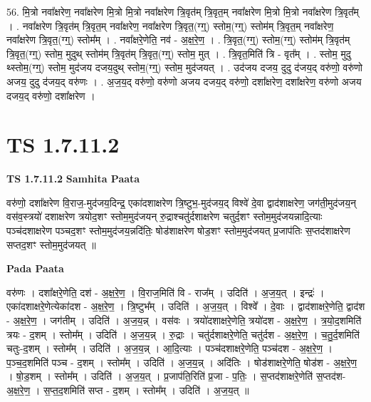 \documentclass[17pt]{extarticle}
\begin{document}
56. मि॒त्रो नवा᳚क्षरेण॒ नवा᳚क्षरेण मि॒त्रो मि॒त्रो नवा᳚क्षरेण त्रि॒वृत॑म् त्रि॒वृत॒म् नवा᳚क्षरेण मि॒त्रो मि॒त्रो नवा᳚क्षरेण त्रि॒वृत᳚म् । . नवा᳚क्षरेण त्रि॒वृत॑म् त्रि॒वृत॒म् नवा᳚क्षरेण॒ नवा᳚क्षरेण त्रि॒वृत॒(ग्ग्॒) स्तोम॒(ग्ग्॒) स्तोम॑म् त्रि॒वृत॒म् 
नवा᳚क्षरेण॒ नवा᳚क्षरेण त्रि॒वृत॒(ग्ग्॒) स्तोम᳚म् । . नवा᳚क्षरे॒णेति॒ नव॑ - अ॒क्ष॒रे॒ण॒ । . त्रि॒वृत॒(ग्ग्॒) स्तोम॒(ग्ग्॒) स्तोम॑म् त्रि॒वृत॑म् त्रि॒वृत॒(ग्ग्॒) स्तोम॒ मुदुथ् स्तोम॑म् त्रि॒वृत॑म् त्रि॒वृत॒(ग्ग्॒) स्तोम॒ मुत् । . त्रि॒वृत॒मिति॑ त्रि - वृत᳚म् । . स्तोम॒ मुदु थ्स्तोम॒(ग्ग्॒) स्तोम॒ मुद॑जय दजय॒दुथ् स्तोम॒(ग्ग्॒) स्तोम॒ मुद॑जयत् । . उद॑जय दजय॒ दुदु द॑जय॒द् वरु॑णो॒ वरु॑णो अजय॒ दुदु द॑जय॒द् वरु॑णः । . अ॒ज॒य॒द् वरु॑णो॒ वरु॑णो अजय दजय॒द् वरु॑णो॒ दशा᳚क्षरेण॒ दशा᳚क्षरेण॒ वरु॑णो अजय दजय॒द् वरु॑णो॒ दशा᳚क्षरेण । \newline
\pagebreak
{}
\section*{ TS 1.7.11.2 }

\textbf{TS 1.7.11.2 } \newline
\textbf{Samhita Paata} \newline

वरु॑णो॒ दशा᳚क्षरेण वि॒राज॒-मुद॑जय॒दिन्द्र॒ एका॑दशाक्षरेण त्रि॒ष्टुभ॒-मुद॑जय॒द् विश्वे॑ दे॒वा द्वाद॑शाक्षरेण॒ जग॑ती॒मुद॑जय॒न् वस॑व॒स्त्रयो॑ दशाक्षरेण त्रयोद॒शꣳ स्तोम॒मुद॑जयन् रु॒द्राश्चतु॑र्दशाक्षरेण चतुर्द॒शꣳ स्तोम॒मुद॑जयन्नादि॒त्याः पञ्च॑दशाक्षरेण पञ्चद॒शꣳ स्तोम॒मुद॑जय॒न्नदि॑तिः॒ षोड॑शाक्षरेण षोड॒शꣳ स्तोम॒मुद॑जयत् प्र॒जाप॑तिः स॒प्तद॑शाक्षरेण सप्तद॒शꣳ स्तोम॒मुद॑जयत् ॥ \newline

\textbf{Pada Paata} \newline

वरु॑णः । दशा᳚क्षरे॒णेति॒ दश॑ - अ॒क्ष॒रे॒ण॒ । वि॒राज॒मिति॑ वि - राज᳚म् । उदिति॑ । अ॒ज॒य॒त् । इन्द्रः॑ । एका॑दशाक्षरे॒णेत्येका॑दश - अ॒क्ष॒रे॒ण॒ । त्रि॒ष्टुभ᳚म् । उदिति॑ । अ॒ज॒य॒त् । विश्वे᳚ । दे॒वाः । द्वाद॑शाक्षरे॒णेति॒ द्वाद॑श - अ॒क्ष॒रे॒ण॒ । जग॑तीम् । उदिति॑ । अ॒ज॒य॒न्न् । वस॑वः । त्रयो॑दशाक्षरे॒णेति॒ त्रयो॑दश - अ॒क्ष॒रे॒ण॒ । त्र॒यो॒द॒शमिति॑ त्रयः - द॒शम् । स्तोम᳚म् । उदिति॑ । अ॒ज॒य॒न्न् । रु॒द्राः । चतु॑र्दशाक्षरे॒णेति॒ चतु॑र्दश - अ॒क्ष॒रे॒ण॒ । च॒तु॒र्द॒शमिति॑ चतुः-द॒शम् । स्तोम᳚म् । उदिति॑ । अ॒ज॒य॒न्न् । आ॒दि॒त्याः । पञ्च॑दशाक्षरे॒णेति॒ पञ्च॑दश - अ॒क्ष॒रे॒ण॒ । प॒ञ्च॒द॒शमिति॑ पञ्च - द॒शम् । स्तोम᳚म् । उदिति॑ । अ॒ज॒य॒॒न्न् । अदि॑तिः । षोड॑शाक्षरे॒णेति॒ षोड॑श - अ॒क्ष॒रे॒ण॒ । षो॒ड॒शम् । स्तोम᳚म् । उदिति॑ । अ॒ज॒य॒त् । प्र॒जाप॑ति॒रिति॑ प्र॒जा - प॒तिः॒ । स॒प्तद॑शाक्षरे॒णेति॑ स॒प्तद॑श-अ॒क्ष॒रे॒ण॒ । स॒प्त॒द॒शमिति॑ सप्त - द॒शम् । स्तोम᳚म् । उदिति॑ । अ॒ज॒य॒त् ॥  \newline
\end{document}

